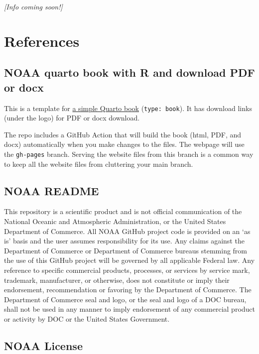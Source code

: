 \documentclass[
  letterpaper,
  oneside,
  open=any]{scrbook}
\begin{document}
\emph{{[}Info coming soon!{]}}


\chapter{References}\label{references}

\section{NOAA quarto book with R and download PDF or
docx}\label{noaa-quarto-book-with-r-and-download-pdf-or-docx}

This is a template for
\href{https://nmfs-opensci.github.io/NOAA-quarto-book/}{a simple Quarto
book} (\texttt{type:\ book}). It has download links (under the logo) for
PDF or docx download.

The repo includes a GitHub Action that will build the book (html, PDF,
and docx) automatically when you make changes to the files. The webpage
will use the \texttt{gh-pages} branch. Serving the website files from
this branch is a common way to keep all the website files from
cluttering your main branch.

\section{NOAA README}\label{noaa-readme}

This repository is a scientific product and is not official
communication of the National Oceanic and Atmospheric Administration, or
the United States Department of Commerce. All NOAA GitHub project code
is provided on an `as is' basis and the user assumes responsibility for
its use. Any claims against the Department of Commerce or Department of
Commerce bureaus stemming from the use of this GitHub project will be
governed by all applicable Federal law. Any reference to specific
commercial products, processes, or services by service mark, trademark,
manufacturer, or otherwise, does not constitute or imply their
endorsement, recommendation or favoring by the Department of Commerce.
The Department of Commerce seal and logo, or the seal and logo of a DOC
bureau, shall not be used in any manner to imply endorsement of any
commercial product or activity by DOC or the United States Government.

\section{NOAA License}\label{noaa-license}
\end{document}
